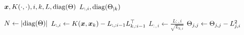 \begin{algorithmic}[1]
  \REQUIRE \( \bm{x}, K(\cdot, \cdot), i, k, L, \operatorname{diag}(\Theta) \)
  \ENSURE \( L_{:, i}, \operatorname{diag}(\Theta_{\mid k}) \)

  \STATE \( N \gets \lvert\operatorname{diag}(\Theta)\rvert \)
  \STATE \(
    L_{:, i} \gets
    K(\bm{x}, \bm{x}_k) - L_{:, :i - 1} L_{k, :i - 1}^{\top}
  \)
  \STATE \( L_{:, i} \gets \frac{L{:, i}}{\sqrt{L_{k, i}}} \)
    \STATE \( \Theta_{j, j} \gets \Theta_{j, j} - L_{j, i}^2 \)
  \ENDFOR
\end{algorithmic}
